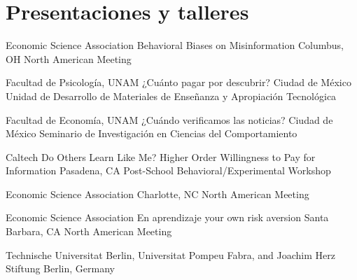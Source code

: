 \section{Presentaciones y talleres}



{Economic Science Association}
{Behavioral Biases on Misinformation}
{Columbus, OH}
{}
{North American Meeting}


{Facultad de Psicología, UNAM}
{¿Cuánto pagar por descubrir?}
{Ciudad de México}
{}
{Unidad de Desarrollo de Materiales de Enseñanza y Apropiación Tecnológica}

{Facultad de Economía, UNAM}
{¿Cuándo verificamos las noticias?}
{Ciudad de México}
{}
{Seminario de Investigación en Ciencias del Comportamiento }

{Caltech}
{Do Others Learn Like Me? Higher Order Willingness to Pay for Information}
{Pasadena, CA}
{}
{Post-School Behavioral/Experimental Workshop}


{Economic Science Association}
{
}
{Charlotte, NC}
{}
{North American Meeting}

{Economic Science Association}
{En aprendizaje your own risk aversion}
{Santa Barbara, CA}
{}
{North American Meeting}

{Technische Universitat Berlin, Universitat Pompeu Fabra, and Joachim Herz Stiftung}
{}
{Berlin, Germany}
{}
{}
